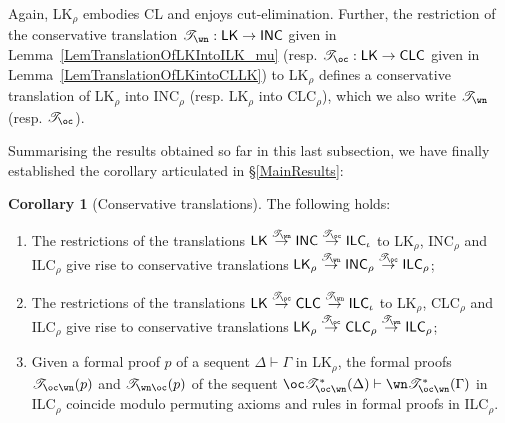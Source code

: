 \documentclass[a4paper]{article}
\theoremstyle{definition}
\theoremstyle{theorem}
\newtheorem{corollary}[definition]{Corollary}
\theoremstyle{remark}
\begin{document}
Again, \textsf{LK}$_\rho$ embodies CL and enjoys cut-elimination.
Further, the restriction of the conservative translation $\mathscr{T}_\wn : \textsf{LK} \rightarrow \textsf{INC}$ given in Lemma~\ref{LemTranslationOfLKIntoILK_mu} (resp. $\mathscr{T}_\oc : \textsf{LK} \rightarrow \textsf{CLC}$ given in Lemma~\ref{LemTranslationOfLKintoCLLK}) to \textsf{LK}$_\rho$ defines a conservative translation of \textsf{LK}$_\rho$ into \textsf{INC}$_\rho$ (resp. \textsf{LK}$_\rho$ into \textsf{CLC}$_\rho$), which we also write $\mathscr{T}_\wn$ (resp. $\mathscr{T}_\oc$).

Summarising the results obtained so far in this last subsection, we have finally established the corollary articulated in \S\ref{MainResults}:
\begin{corollary}[Conservative translations]
\label{CorMainCorollary}
The following holds:
\begin{enumerate}

\item The restrictions of the translations $\textsf{LK} \stackrel{\mathscr{T}_\wn}{\rightarrow} \textsf{INC} \stackrel{\mathscr{T}_\oc}{\rightarrow} \textsf{ILC}_\iota$ to \textsf{LK}$_\rho$, \textsf{INC}$_\rho$ and \textsf{ILC}$_\rho$ give rise to conservative translations $\textsf{LK}_\rho \stackrel{\mathscr{T}_\wn}{\rightarrow} \textsf{INC}_\rho \stackrel{\mathscr{T}_\oc}{\rightarrow} \textsf{ILC}_\rho$;

\item The restrictions of the translations $\textsf{LK} \stackrel{\mathscr{T}_\oc}{\rightarrow} \textsf{CLC} \stackrel{\mathscr{T}_\wn}{\rightarrow} \textsf{ILC}_\iota$ to \textsf{LK}$_\rho$, \textsf{CLC}$_\rho$ and \textsf{ILC}$_\rho$ give rise to conservative translations $\textsf{LK}_\rho \stackrel{\mathscr{T}_\oc}{\rightarrow} \textsf{CLC}_\rho \stackrel{\mathscr{T}_\wn}{\rightarrow} \textsf{ILC}_\rho$;

\item Given a formal proof $p$ of a sequent $\Delta \vdash \Gamma$ in \textsf{LK}$_\rho$, the formal proofs $\mathscr{T}_{\oc\wn}(p)$ and $\mathscr{T}_{\wn\oc}(p)$ of the sequent $\oc \mathscr{T}_{\oc\wn}^\ast(\Delta) \vdash \wn \mathscr{T}_{\oc\wn}^\ast(\Gamma)$ in \textsf{ILC$_\rho$} coincide modulo permuting axioms and rules in formal proofs in \textsf{ILC$_\rho$}.

\end{enumerate}
\end{corollary}
\end{document}
